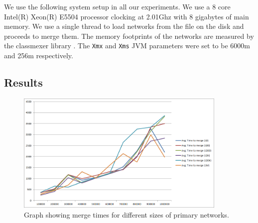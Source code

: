 We use the following system setup in all our experiments. We use a 8 core Intel(R) Xeon(R) E5504 processor clocking at 2.01Ghz with 8 gigabytes of main memory. We use a single thread to load networks from the file on the disk and proceeds to merge them. The memory footprints of the networks are measured by the classmexer library \cite{classmexer}. The \texttt{Xmx} and \texttt{Xms} JVM parameters were set to be 6000m and 256m respectively.

\subsection{Results}

\begin{figure}[t]
\centering
\includegraphics[width=0.9\textwidth]{media/chapter5/perf/mergebignodetest.png}
\caption{Graph showing merge times for different sizes of primary networks.}
\label{fig:agg}
\end{figure}

